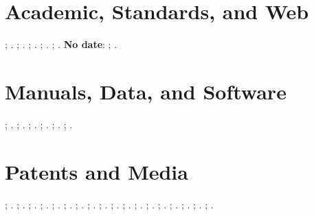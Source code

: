 \documentclass[a4paper,12pt]{article}
\begin{document}
\section*{Academic, Standards, and Web}
\citet{thesis-1-complete}; \citep{thesis-1-complete}.
\citet{thesis-2-missing-type-institution}; \citep{thesis-2-missing-type-institution}.
\citet{std-1-complete}; \citep{std-1-complete}.
\citet{std-2-missing-organization-number}; \citep{std-2-missing-organization-number}.
\citet{online-1-with-doi}; \citep{online-1-with-doi}.
\textbf{No date}: \citet{online-2-url-only-no-date}; \citep{online-2-url-only-no-date}.
\section*{Manuals, Data, and Software}
\citet{manual-1-complete}; \citep{manual-1-complete}.
\citet{manual-2-missing-org}; \citep{manual-2-missing-org}.
\citet{dataset-1-complete-doi}; \citep{dataset-1-complete-doi}.
\citet{dataset-2-url-only}; \citep{dataset-2-url-only}.
\citet{soft-1-complete}; \citep{soft-1-complete}.
\citet{soft-2-missing-version-date}; \citep{soft-2-missing-version-date}.
\section*{Patents and Media}
\citet{pat-1-complete}; \citep{pat-1-complete}.
\citet{pat-2-missing-holder}; \citep{pat-2-missing-holder}.
\citet{video-1-complete}; \citep{video-1-complete}.
\citet{video-2-missing-author-has-org}; \citep{video-2-missing-author-has-org}.
\citet{audio-1-complete}; \citep{audio-1-complete}.
\citet{audio-2-missing-number}; \citep{audio-2-missing-number}.
\citet{art-obj-1-complete}; \citep{art-obj-1-complete}.
\citet{img-1-missing-author-has-org}; \citep{img-1-missing-author-has-org}.
\citet{press-1-complete}; \citep{press-1-complete}.
\citet{press-2-missing-url}; \citep{press-2-missing-url}.
\citet{letter-1-complete}; \citep{letter-1-complete}.
\citet{letter-2-missing-recipient}; \citep{letter-2-missing-recipient}.
\citet{unpub-1-complete}; \citep{unpub-1-complete}.
\citet{unpub-2-missing-date}; \citep{unpub-2-missing-date}.
\citet{interv-1-complete}; \citep{interv-1-complete}.
\citet{interv-2-missing-interviewer}; \citep{interv-2-missing-interviewer}.
\citet{misc-1-complete}; \citep{misc-1-complete}.
\citet{misc-2-missing-author-date}; \citep{misc-2-missing-author-date}.
\printbibliography[title={References}]
\end{document}
